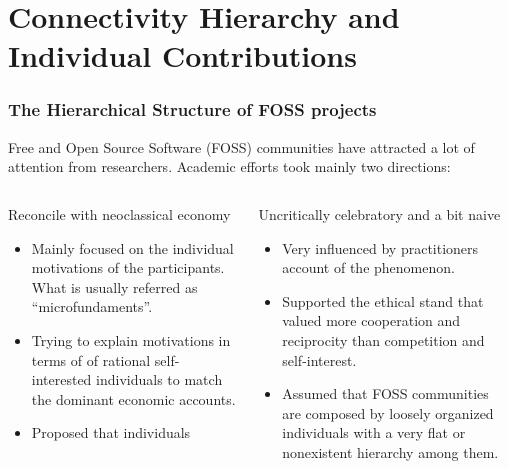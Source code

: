 \documentclass[ignorenonframetext,red,8pt,notes=hide]{beamer}
\begin{document}
\section{Connectivity Hierarchy and Individual Contributions}

\begin{frame}
\frametitle{The Hierarchical Structure of FOSS projects}

Free and Open Source Software (FOSS) communities have attracted a lot of attention from researchers. Academic efforts took mainly two directions:

\begin{columns}[c]
\begin{column}{0.5\textwidth}
\begin{block}{Reconcile with neoclassical economy}
\begin{itemize}
\item Mainly focused on the individual motivations of the participants. What is usually referred as ``microfundaments''.
\item Trying to explain motivations in terms of of rational self-interested individuals to match the dominant economic accounts.
\item Proposed that individuals 
\end{itemize}
\end{block}
\end{column}

\pause

\begin{column}{0.5\textwidth}

\begin{block}{Uncritically celebratory and a bit naive}
\begin{itemize}
\item Very influenced by practitioners account of the phenomenon.
\item Supported the ethical stand that valued more cooperation and reciprocity than competition and self-interest.
\item Assumed that FOSS communities are composed by loosely organized individuals with a very flat or nonexistent hierarchy among them.
\end{itemize}
\end{block}
\end{column}
\end{columns}

\pause



\end{frame}
\end{document}
